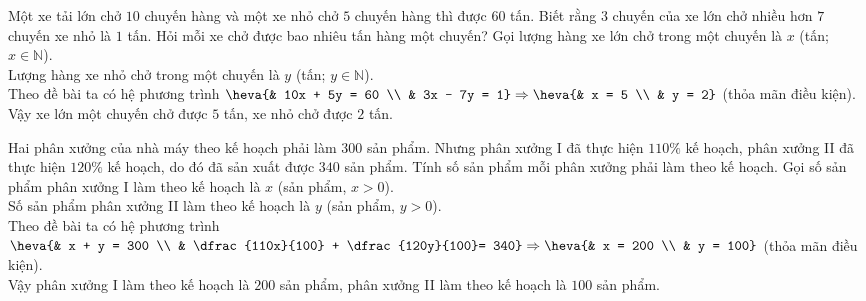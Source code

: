 \begin{bt}%
	Một xe tải lớn chở $10$ chuyến hàng và một xe nhỏ chở $5$ chuyến hàng thì được $60$ tấn. Biết rằng $3$ chuyến của xe lớn chở nhiều hơn $7$ chuyến xe nhỏ là $1$ tấn. Hỏi mỗi xe chở được bao nhiêu tấn hàng một chuyến?
	\loigiai
	{
	Gọi lượng hàng xe lớn chở trong một chuyến là $x$ (tấn; $x \in \mathbb{N}$).\\
	Lượng hàng xe nhỏ chở trong một chuyến là $y$ (tấn; $y \in \mathbb{N}$).\\
	Theo đề bài ta có hệ phương trình $\heva{& 10x + 5y = 60 \\ & 3x - 7y = 1} \Rightarrow \heva{& x = 5 \\ & y = 2}$ (thỏa mãn điều kiện).\\
	Vậy xe lớn một chuyến chở được $5$ tấn, xe nhỏ chở được $2$ tấn.
	}
\end{bt}
\begin{bt}%
	Hai phân xưởng của nhà máy theo kế hoạch phải làm $300$ sản phẩm. Nhưng phân xưởng I đã thực hiện $110\%$ kế hoạch, phân xưởng II đã thực hiện $120\%$ kế hoạch, do đó đã sản xuất được $340$ sản phẩm. Tính số sản phẩm mỗi phân xưởng phải làm theo kế hoạch.	
	\loigiai
	{
	Gọi số sản phẩm phân xưởng I làm theo kế hoạch là $x$ (sản phẩm, $x > 0$).\\
	Số sản phẩm phân xưởng II làm theo kế hoạch là $y$ (sản phẩm, $y > 0$).\\
	Theo đề bài ta có hệ phương trình $\heva{& x + y = 300 \\ & \dfrac{110x}{100} + \dfrac{120y}{100}= 340} \Rightarrow \heva{& x = 200 \\ & y = 100}$ (thỏa mãn điều kiện).\\
	Vậy phân xưởng I làm theo kế hoạch là $200$ sản phẩm, phân xưởng II làm theo kế hoạch là $100$ sản phẩm. 
	}
\end{bt}
